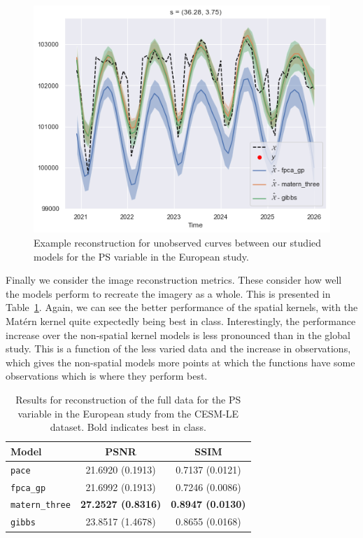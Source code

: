 \begin{figure}
	\centering
	\includegraphics[width=\textwidth]{test_ex_ps_eur}
	\caption{Example reconstruction for unobserved curves between our studied models for the PS variable in the European study.}
	\label{fig:test_ex_ps_eur}
\end{figure}

Finally we consider the image reconstruction metrics.
These consider how well the models perform to recreate the imagery as a whole. 
This is presented in Table~\ref{tab:full_cesm_ps_eur}.
Again, we can see the better performance of the spatial kernels, with the Mat\'ern kernel quite expectedly being best in class.
Interestingly, the performance increase over the non-spatial kernel models is less pronounced than in the global study.
This is a function of the less varied data and the increase in observations, which gives the non-spatial models more points at which the functions have some observations which is where they perform best.

\begin{table}
	\caption[Results for PS variable on full data in the European study]{Results for reconstruction of the full data for the PS variable in the European study from the CESM-LE dataset. Bold indicates best in class.}
	\centering
	\label{tab:full_cesm_ps_eur}
	\begin{tabular}{lcc}
		\toprule
		\textbf{Model} & \textbf{PSNR} & \textbf{SSIM} \\
		\midrule
		\verb*|pace| & 21.6920 (0.1913) & 0.7137 (0.0121) \\
		\verb*|fpca_gp| & 21.6992 (0.1913)& 0.7246	(0.0086) \\
		\verb*|matern_three| & \textbf{27.2527	(0.8316)}& \textbf{0.8947 (0.0130)}\\
		\verb*|gibbs| & 23.8517	(1.4678) & 0.8655 (0.0168)\\
		\bottomrule
	\end{tabular}
\end{table}

